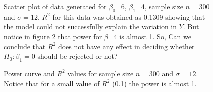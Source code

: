 \documentclass[11pt]{article}
\begin{document}
\begin{figure}[hbtp]
   \centering
       \caption{Scatter plot of data generated for $\beta_0$=6, $\beta_1$=4, sample size $n =300$ and $\sigma = 12$. $R^2$ for this data was obtained as 0.1309 showing that the model could not successfully explain the variation in $Y$. But notice in figure \ref{fig:power_rsq} that power for $\beta$=4 is almost 1. So, Can we conclude that $R^2$ does not have any effect in deciding whether $H_0: \beta_1=0$ should be rejected or not?}
       \label{fig:plot_beta_4}
\end{figure}


\begin{figure}[hbtp]
   \centering
       \caption{Power curve and $R^2$ values for sample size $n =300$ and $\sigma = 12$. Notice that for a small value of $R^2$ (0.1) the power is almost 1.}
       \label{fig:power_rsq}
\end{figure}
\end{document}
